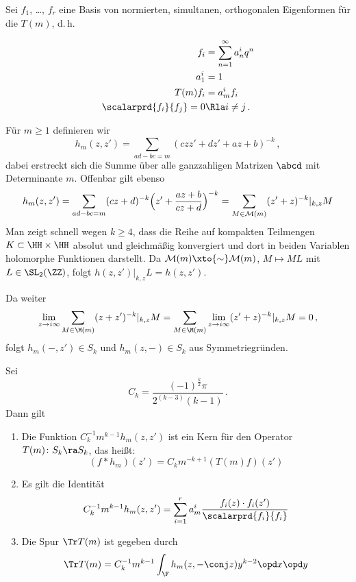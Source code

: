 Sei $f_1$, \ldots, $f_r$ eine Basis von normierten, simultanen, orthogonalen Eigenformen für die $T(m)$, d.\,h.

\begin{align*}
	f_i &= \sum_{n=1}^\infty a_n^i q^n \\
	a_1^i &= 1 \\
	T(m)f_i &= a_m^if_i \\
	\scalarprd {f_i}{f_j} = 0 &\Rla i \not= j
	\,.
\end{align*}


Für $m \geq 1$ definieren wir
\[
	h_m(z, z') = \sum_{ad-bc=m} (czz' + dz' + az + b)^{-k}
	\,,
\]
dabei erstreckt sich die Summe über alle ganzzahligen Matrizen $\abcd$ mit Determinante $m$.
Offenbar gilt ebenso
\[
	h_m(z,z') = \sum_{ad-bc=m} (cz+d)^{-k} \Bigl(z' + \frac{az+b}{cz+d}\Bigr)^{-k}
	= \sum_{M \in \mathcal{M}(m)} (z'+z)^{-k}|_{k,z} M
\]
Man zeigt schnell wegen $k \geq 4$, dass die Reihe auf kompakten Teilmengen $K \subset \HH \times \HH$ absolut und gleichmäßig konvergiert und dort in beiden Variablen holomorphe Funktionen darstellt.
Da $\mathcal{M}(m) \xto{\sim} \mathcal{M}(m)$, $M \mapsto ML$ mit $L \in \SL_2(\ZZ)$,
folgt $h(z,z')|_{k,z} L = h(z, z')$.

Da weiter
\begin{align*}
	\lim_{z \to i\infty} \sum_{M \in \M(m)} (z+z')^{-k}|_{k,z} M
	= \sum_{M \in \M(m)} \lim_{z \to i\infty} (z'+z)^{-k}|_{k,z} M
	= 0\,,
\end{align*}
folgt $h_m(-, z') \in S_k$ und $h_m(z, -) \in S_k$ aus Symmetriegründen.


\begin{satz}
	Sei
	\begin{equation}%
		C_k = \frac{(-1)^{\frac{k}{2}} \pi}{2^{(k-3)}(k-1)}\,.
	\end{equation}
	Dann gilt
	\begin{enumerate}
		\item Die Funktion $C_k^{-1} m^{k-1} h_m(z,z')$ ist ein Kern für den Operator $T(m)\colon S_k \ra S_k$, das heißt:
		\begin{equation}\label{eq:faltung_hm}%
			(f * h_m)(z') = C_km^{-k+1} (T(m)f)(z')
		\end{equation}
		\item Es gilt die Identität 
		\begin{equation}%
			C_k^{-1} m^{k-1} h_m(z,z') = \sum_{i=1}^r a_m^i \frac{f_i(z) \cdot f_i(z')}{\scalarprd{f_i}{f_i}}
		\end{equation}
		\item Die Spur $\Tr T(m)$ ist gegeben durch
		\begin{equation}%
			\Tr T(m) = C_k^{-1} m^{k-1} \int_\F h_m(z, -\conj z) y^{k-2} \opd x \opd y
		\end{equation}
	\end{enumerate}
\end{satz}

